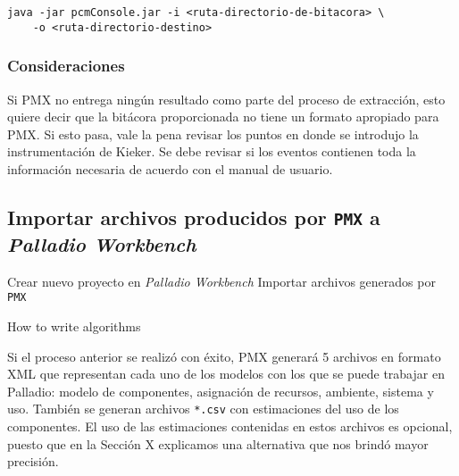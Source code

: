 \begin{verbatim}
java -jar pcmConsole.jar -i <ruta-directorio-de-bitacora> \
    -o <ruta-directorio-destino>
\end{verbatim}

\subsubsection{Consideraciones}
Si PMX no entrega ningún resultado como parte del proceso de extracción, esto quiere decir que la bitácora proporcionada no tiene un formato apropiado para PMX. Si esto pasa, vale la pena revisar los puntos en donde se introdujo la instrumentación de Kieker. Se debe revisar si los eventos contienen toda la información necesaria de acuerdo con el manual de usuario. 

\subsection{Importar archivos producidos por \texttt{PMX} a \emph{Palladio Workbench}}
\begin{singlespace}
\begin{algorithm}[H]
\SetAlgoLined
Crear nuevo proyecto en \emph{Palladio Workbench}\;
Importar archivos generados por \texttt{PMX}\;
\caption{How to write algorithms}
\end{algorithm}
\end{singlespace}

Si el proceso anterior se realizó con éxito, PMX  generará 5 archivos en formato XML que representan cada uno de los modelos con los que se puede trabajar en Palladio: modelo de componentes, asignación de recursos, ambiente, sistema y uso. También se generan archivos \texttt{*.csv} con estimaciones del uso de los componentes. El uso de las estimaciones contenidas en estos archivos es opcional, puesto que en la Sección X explicamos una alternativa que nos brindó mayor precisión.

